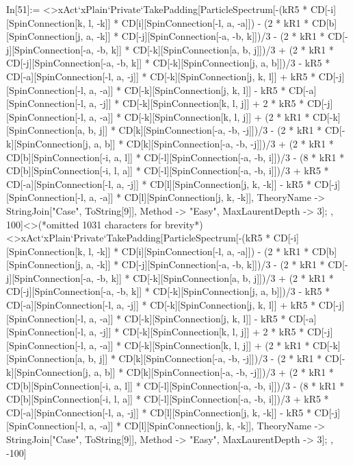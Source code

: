 In[51]:= <>xAct`xPlain`Private`TakePadding[ParticleSpectrum[-(kR5 * CD[-i][SpinConnection[k, l, -k]] * CD[i][SpinConnection[-l, a, -a]]) - (2 * kR1 * CD[b][SpinConnection[j, a, -k]] * CD[-j][SpinConnection[-a, -b, k]])/3 - (2 * kR1 * CD[-j][SpinConnection[-a, -b, k]] * CD[-k][SpinConnection[a, b, j]])/3 + (2 * kR1 * CD[-j][SpinConnection[-a, -b, k]] * CD[-k][SpinConnection[j, a, b]])/3 - kR5 * CD[-a][SpinConnection[-l, a, -j]] * CD[-k][SpinConnection[j, k, l]] + kR5 * CD[-j][SpinConnection[-l, a, -a]] * CD[-k][SpinConnection[j, k, l]] - kR5 * CD[-a][SpinConnection[-l, a, -j]] * CD[-k][SpinConnection[k, l, j]] + 2 * kR5 * CD[-j][SpinConnection[-l, a, -a]] * CD[-k][SpinConnection[k, l, j]] + (2 * kR1 * CD[-k][SpinConnection[a, b, j]] * CD[k][SpinConnection[-a, -b, -j]])/3 - (2 * kR1 * CD[-k][SpinConnection[j, a, b]] * CD[k][SpinConnection[-a, -b, -j]])/3 + (2 * kR1 * CD[b][SpinConnection[-i, a, l]] * CD[-l][SpinConnection[-a, -b, i]])/3 - (8 * kR1 * CD[b][SpinConnection[-i, l, a]] * CD[-l][SpinConnection[-a, -b, i]])/3 + kR5 * CD[-a][SpinConnection[-l, a, -j]] * CD[l][SpinConnection[j, k, -k]] - kR5 * CD[-j][SpinConnection[-l, a, -a]] * CD[l][SpinConnection[j, k, -k]], TheoryName -> StringJoin["Case", ToString[9]], Method -> "Easy", MaxLaurentDepth -> 3]; , 100]<>(*omitted 1031 characters for brevity*)<>xAct`xPlain`Private`TakePadding[ParticleSpectrum[-(kR5 * CD[-i][SpinConnection[k, l, -k]] * CD[i][SpinConnection[-l, a, -a]]) - (2 * kR1 * CD[b][SpinConnection[j, a, -k]] * CD[-j][SpinConnection[-a, -b, k]])/3 - (2 * kR1 * CD[-j][SpinConnection[-a, -b, k]] * CD[-k][SpinConnection[a, b, j]])/3 + (2 * kR1 * CD[-j][SpinConnection[-a, -b, k]] * CD[-k][SpinConnection[j, a, b]])/3 - kR5 * CD[-a][SpinConnection[-l, a, -j]] * CD[-k][SpinConnection[j, k, l]] + kR5 * CD[-j][SpinConnection[-l, a, -a]] * CD[-k][SpinConnection[j, k, l]] - kR5 * CD[-a][SpinConnection[-l, a, -j]] * CD[-k][SpinConnection[k, l, j]] + 2 * kR5 * CD[-j][SpinConnection[-l, a, -a]] * CD[-k][SpinConnection[k, l, j]] + (2 * kR1 * CD[-k][SpinConnection[a, b, j]] * CD[k][SpinConnection[-a, -b, -j]])/3 - (2 * kR1 * CD[-k][SpinConnection[j, a, b]] * CD[k][SpinConnection[-a, -b, -j]])/3 + (2 * kR1 * CD[b][SpinConnection[-i, a, l]] * CD[-l][SpinConnection[-a, -b, i]])/3 - (8 * kR1 * CD[b][SpinConnection[-i, l, a]] * CD[-l][SpinConnection[-a, -b, i]])/3 + kR5 * CD[-a][SpinConnection[-l, a, -j]] * CD[l][SpinConnection[j, k, -k]] - kR5 * CD[-j][SpinConnection[-l, a, -a]] * CD[l][SpinConnection[j, k, -k]], TheoryName -> StringJoin["Case", ToString[9]], Method -> "Easy", MaxLaurentDepth -> 3]; , -100]